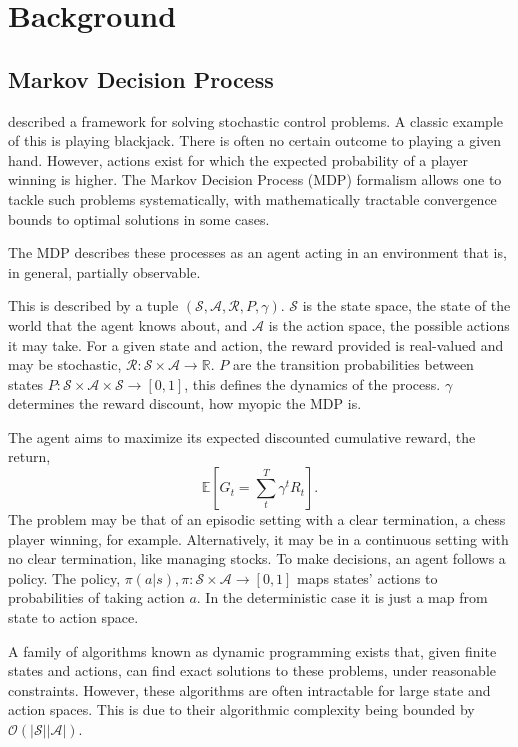 
\chapter{Background}\label{chap:background}
\section{Markov Decision Process}

\cite{bellamn1957mdp} described a framework for solving stochastic control problems. A classic example of this is playing blackjack. There is often no certain outcome to playing a given hand. However, actions exist for which the expected probability of a player winning is higher. The Markov Decision Process (MDP) formalism allows one to tackle such problems systematically, with mathematically tractable convergence bounds to optimal solutions in some cases.

The MDP describes these processes as an agent acting in an environment that is, in general, partially observable.

This is described by a tuple $(\mathcal{S}, \mathcal{A}, \mathcal{R}, P, \gamma)$. $\mathcal{S}$ is the state space, the state of the world that the agent knows about, and $\mathcal{A}$ is the action space, the possible actions it may take. For a given state and action, the reward provided is real-valued and may be stochastic, $\mathcal{R}: \mathcal{S} \times \mathcal{A} \rightarrow \mathbb{R}$. $P$ are the transition probabilities between states $P: \mathcal{S} \times \mathcal{A} \times \mathcal{S} \rightarrow [0, 1]$, this defines the dynamics of the process. $\gamma $ determines the reward discount, how myopic the MDP is.

The agent aims to maximize its expected discounted cumulative reward, the return,
\begin{equation}
	\mathbb{E} [ G_t = \sum_t^T \gamma^t R_t ] .
\end{equation}
The problem may be that of an episodic setting with a clear termination, a chess player winning, for example. Alternatively, it may be in a continuous setting with no clear termination, like managing stocks. To make decisions, an agent follows a policy. The policy, $\pi(a|s), \pi: \mathcal{S} \times \mathcal{A} \rightarrow [0, 1]$ maps states' actions to probabilities of taking action $a$. In the deterministic case it is just a map from state to action space.


A family of algorithms known as dynamic programming exists that, given finite states and actions, can find exact solutions to these problems, under reasonable constraints. However, these algorithms are often intractable for large state and action spaces. This is due to their algorithmic complexity being bounded by $\mathcal{O}(|\mathcal{S}||\mathcal{A}|)$.

